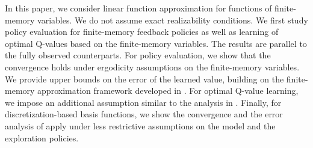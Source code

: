 \documentclass[letterpaper, 10 pt, conference]{ieeeconf}  %
\theoremstyle{definition}
\theoremstyle{remark}
\begin{document}
In this paper, we consider linear function approximation for functions of finite-memory variables. We do not assume exact realizability conditions. We first study policy evaluation for finite-memory feedback policies as well as  learning of optimal Q-values based on the finite-memory variables. The results are parallel to the fully observed counterparts. For policy evaluation, we show that the convergence holds under ergodicity assumptions on the finite-memory variables. We provide upper bounds on the error of the learned value, building on the finite-memory approximation framework
developed in \cite{kara2020near,kara2023convergence}. For optimal Q-value learning, we impose an additional assumption similar to the analysis in \cite{melo2008analysis}. Finally, for discretization-based basis functions, we show the convergence and the error analysis of \cite{devran2025near} apply under less restrictive assumptions on the model and the exploration policies. 
\end{document}
